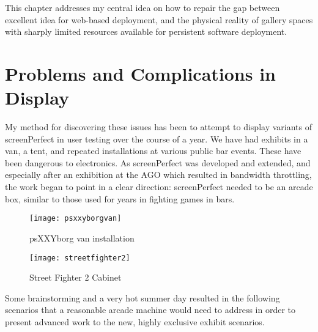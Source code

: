 This chapter addresses my central idea on how to repair the gap between excellent idea for web-based deployment, and the physical reality of gallery spaces with sharply limited resources available for persistent software deployment.


\section{Problems and Complications in Display}

My method for discovering these issues has been to attempt to display variants of screenPerfect in user testing over the course of a year. We have had exhibits in a van, a tent, and repeated installations at various public bar events. These have been dangerous to electronics. As screenPerfect was developed and extended, and especially after an exhibition at the AGO which resulted in bandwidth throttling, the work began to point in a clear direction: screenPerfect needed to be an arcade box, similar to those used for years in fighting games in bars.

\begin{figure}[h!]
  \caption{psXXYborg van installation}
  \centering
    \texttt{[image: psxxyborgvan]}
\end{figure}

\begin{figure}[h!]
  \caption{Street Fighter 2 Cabinet}
  \centering
    \texttt{[image: streetfighter2]}
\end{figure}

Some brainstorming and a very hot summer day resulted in the following scenarios that a reasonable arcade machine would need to address in order to present advanced work to the new, highly exclusive exhibit scenarios.

